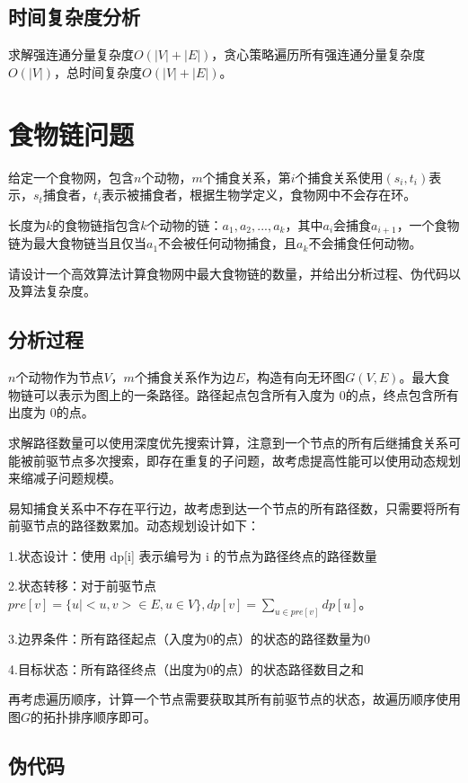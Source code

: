 \documentclass{article}
\begin{document}
\subsection{时间复杂度分析}
求解强连通分量复杂度$O(|V|+|E|)$，贪心策略遍历所有强连通分量复杂度$O(|V|)$，总时间复杂度$O(|V|+|E|)$。


\section{食物链问题}
给定一个食物网，包含$ n $个动物，$m $个捕食关系，第$ i $个捕食关系使用$ (s_i
, t_i) $表示，$s_t $捕食者，$t_i $表示被捕食者，根据生物学定义，食物网中不会存在环。

长度为$ k $的食物链指包含$ k $个动物的链：$a_1, a_2, ... , a_k$，其中$ a_i $会捕食$ a_{i+1}$，一个食物链为最大食物链当且仅当$ a_1 $不会被任何动物捕食，且$ a_k $不会捕食任何动物。

请设计一个高效算法计算食物网中最大食物链的数量，并给出分析过程、伪代码以及算法复杂度。

\subsection{分析过程}
$n $个动物作为节点$ V $，$m $个捕食关系作为边$ E$，构造有向无环图$ G(V, E)$。最大食物链可以表示为图上的一条路径。路径起点包含所有入度为 0的点，终点包含所有出度为 0的点。

求解路径数量可以使用深度优先搜索计算，注意到一个节点的所有后继捕食关系可能被前驱节点多次搜索，即存在重复的子问题，故考虑提高性能可以使用动态规划来缩减子问题规模。

易知捕食关系中不存在平行边，故考虑到达一个节点的所有路径数，只需要将所有前驱节点的路径数累加。动态规划设计如下：

1.状态设计：使用 dp[i] 表示编号为 i 的节点为路径终点的路径数量

2.状态转移：对于前驱节点$ pre[v] = \{u| < u, v >\in E, u \in V \},dp[v] = \sum_{u\in pre[v]}dp[u]$。

3.边界条件：所有路径起点（入度为0的点）的状态的路径数量为0

4.目标状态：所有路径终点（出度为0的点）的状态路径数目之和

再考虑遍历顺序，计算一个节点需要获取其所有前驱节点的状态，故遍历顺序使用图$G$的拓扑排序顺序即可。



\subsection{伪代码}
\end{document}
